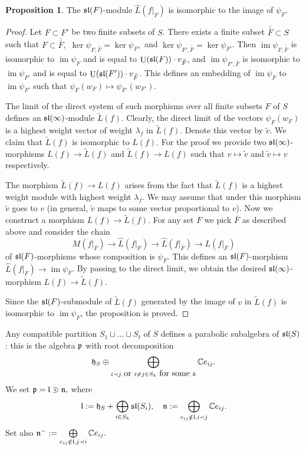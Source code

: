 \documentclass[10pt]{amsart}\oddsidemargin -1mm \evensidemargin -1mm \topmargin -15mm\headheight5mm \headsep 3.5mm \textheight 245mm\textwidth 170mm %
\theoremstyle{definition}\newtheorem{theorem}{Theorem}[section]\newtheorem{lemma}[theorem]{Lemma}\newtheorem{remark}[theorem]{Remark}\newtheorem{proposition}[theorem]{Proposition}\newtheorem{corollary}[theorem]{Corollary}\newtheorem{definition}[theorem]{Definition}\newtheorem{Ex}[theorem]{Example}
\DeclareMathOperator{\Ima}{\mathrm{im}}\DeclareMathOperator{\RS}{\mathrm{RS}}\DeclareMathOperator{\wid}{A}\DeclareMathOperator{\nint}{\alpha}\DeclareMathOperator{\Lfai}{\mathrm{Lfai}}\DeclareMathOperator{\APAut}{\mathrm{Aut}}\DeclareMathOperator{\APcork}{\mathrm{cork}}\DeclareMathOperator{\VAnn}{\mathrm{VAnn}}\DeclareMathOperator{\APrk}{\mathrm{rk}}\DeclareMathOperator{\Sa}{\mathbf{S}}\DeclareMathOperator{\I}{I}\DeclareMathOperator{\Hom}{\mathrm{Hom}}\DeclareMathOperator{\Sh}{\mathrm{Sh}}\DeclareMathOperator{\Q}{\mathrm{Q}}\DeclareMathOperator{\Irr}{\mathrm{Irr}}\DeclareMathOperator{\Ue}{\mathrm{U}}\DeclareMathOperator{\seq}{\mathrm{seq}}\DeclareMathOperator{\tr}{\mathrm{tr}}\DeclareMathOperator{\Ss}{\mathrm{S}}\DeclareMathOperator{\cls}{\mathrm{cls}}\DeclareMathOperator{\Ind}{\mathrm{Ind}}\DeclareMathOperator{\Fss}{\mathrm{FSet}}\DeclareMathOperator{\injo}{\mathrm{inj_0}}\DeclareMathOperator{\Ver}{{\it M}}\DeclareMathOperator{\Adj}{\mathrm{Adj}}\DeclareMathOperator{\APinj}{\mathrm{inj}}\DeclareMathOperator{\Ann}{\mathrm{Ann}}\DeclareMathOperator{\ZAnn}{\mathrm{ZAnn}}\DeclareMathOperator{\ZUe}{\mathrm{ZU}}\DeclareMathOperator{\Var}{\mathrm{Var}}\DeclareMathOperator{\ZVar}{\mathrm{ZVar}}
\newcounter{AP}
\begin{document}
\begin{proposition}\label{Pfinf}The $\frak{sl}(F)$-module $\widehat L(f|_F)$ is isomorphic to the image of $\psi_F$.\end{proposition}
\begin{proof}Let $F\subset F'$ be two finite subsets of $S$. There exists a finite subset $\bar{\bar F}\subset S$ such that $F\subset\bar{\bar F},$ $\ker \psi_{F, \bar{\bar F}}=\ker\psi_F,$ and $\ker\psi_{F', \bar{\bar F}}=\ker \psi_{F'}$. Then $\Ima \psi_{F, \bar{\bar F}}$ is isomorphic to $\Ima\psi_F$ and is equal to $\Ue(\frak{sl}(F))\cdot v_{\bar{\bar F}}$, and $\Ima\psi_{F', \bar{\bar F}}$ is isomorphic to $\Ima\psi_{F'}$ and is equal to $\Ue(\frak{sl}(F'))\cdot v_{\bar{\bar F}}$. This defines an embedding of $\Ima\psi_F$ to $\Ima\psi_{F'}$ such that $\psi_F(w_F)\mapsto \psi_{F'}(w_{F'})$.

The limit of the direct system of such morphisms over all finite subsets $F$ of $S$ defines an $\frak{sl}(\infty)$-module $\tilde L(f)$. Clearly, the direct limit of the vectors $\psi_F(w_F)$ is a highest weight vector of weight $\lambda_f$ in $\tilde L(f)$. Denote this vector by $\tilde v$. We claim that $\tilde L(f)$ is isomorphic to $L(f)$. For the proof we provide two $\frak{sl}(\infty)$-morphisms $L(f)\to \tilde L(f)$ and $\tilde L(f)\to L(f)$ such that $v\mapsto \tilde v$ and $\tilde v\mapsto v$ respectively.

The morphism $\tilde L(f)\to L(f)$ arises from the fact that $\tilde L(f)$ is a highest weight module with highest weight $\lambda_f$. We may assume that under this morphism $\tilde v$ goes to $v$ (in general, $\tilde v$ maps to some vector proportional to $v$). Now we construct a morphism $L(f)\to \tilde L(f)$. For any set $F$ we pick $\bar F$ as described above and consider the chain
$$M(f|_F)\to\widehat L(f|_F)\to\widehat L(f|_{\bar F})\to L(f|_{\bar F})$$
of $\frak{sl}(F)$-morphisms whose composition is $\psi_F$. This defines an $\frak{sl}(F)$-morphism $\widehat L(f|_F)\to \Ima\psi_F$. By passing to the direct limit, we obtain the desired $\frak{sl}(\infty)$-morphism $L(f)\to \tilde L(f)$.

Since the $\frak{sl}(F)$-submodule of $\tilde L(f)$ generated by the image of $v$ in $\tilde L(f)$ is isomorphic to $\Ima\psi_F$, the proposition is proved.\end{proof}


Any compatible partition $S_1\sqcup...\sqcup S_t$ of $S$ defines a parabolic subalgebra of $\frak{sl}(S)$: this is the algebra $\frak p$ with root decomposition $$\frak h_S\oplus\bigoplus\limits_{i\prec j\mbox{~or~}i\ne j\in S_k\mbox{~for~some~}k}\mathbb Ce_{ij}.$$
We set $\frak p=\frak l \supsetplus\frak n,$ where $$\frak l:=\frak h_S+\bigoplus\limits_{i\in S_k}\frak{sl}(S_i),\hspace{10pt}\frak n:=\bigoplus\limits_{e_{ij}\notin\frak l, i\prec j}\mathbb Ce_{ij}.$$
Set also $\frak n^-:=\bigoplus\limits_{e_{ij}\notin\frak l, j\prec i}\mathbb Ce_{ij}.$
\end{document}
